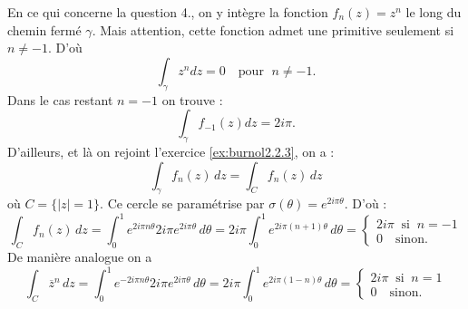 {\begin{enumerate}
{En ce qui concerne la question 4., on y int\`egre la fonction $f_n(z)=z^n$ le long du chemin ferm\'e $\gamma$.
Mais attention, cette fonction admet une primitive seulement si $n\neq -1$. D'o\`u
$$\int_\gamma z^n dz =0 \quad \text{pour } \; n\neq -1.$$
Dans le cas restant $n=-1$ on trouve :
$$\int_\gamma f_{-1}(z)dz =2i\pi.$$
D'ailleurs, et l\`a on rejoint l'exercice \ref{ex:burnol2.2.3}, on a :
$$\int_\gamma f_n(z)\, dz = \int_C f_n(z)\, dz $$
o\`u $C=\{ |z|=1\}$. Ce cercle se param\'etrise par $\sigma (\theta ) =e^{2i\pi \theta}$. D'o\`u :
$$\int_C f_n(z)\, dz=\int_0^1 e^{2i\pi n\theta} 2i\pi e^{2i\pi \theta} \, d\theta
=2i\pi \int_0^1 e^{2i\pi (n+1) \theta}\, d\theta =\left\{ \begin{array}{c}
                                                            2i\pi \;\; \text{si} \;\; n=-1 \\
                                                            0 \quad \text{sinon}.
                                                          \end{array}
\right.$$
De mani\`ere analogue on a
$$\int_C \overline{z}^n\, dz=\int_0^1 e^{-2i\pi n\theta} 2i\pi e^{2i\pi \theta} \, d\theta
=2i\pi \int_0^1 e^{2i\pi (1-n) \theta}\, d\theta =\left\{ \begin{array}{c}
                                                            2i\pi \;\; \text{si} \;\; n=1 \\
                                                            0 \quad \text{sinon.}
                                                          \end{array}
\right.$$
}
\end{enumerate}
}
